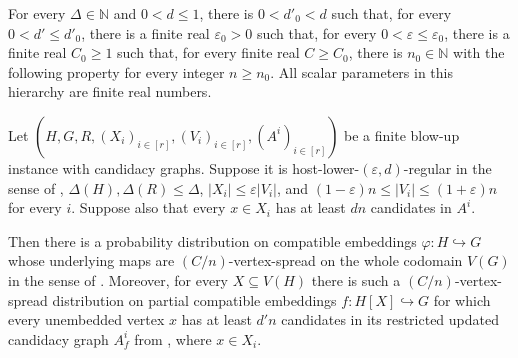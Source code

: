 \begin{lemma}
For every $\Delta\in\mathbb N$ and $0<d\leq1$, there is $0<d'_0<d$ such that, for every $0<d'\leq d'_0$, there is a finite real $\varepsilon_0>0$ such that, for every $0<\varepsilon\leq\varepsilon_0$, there is a finite real $C_0\geq1$ such that, for every finite real $C\geq C_0$, there is $n_0\in\mathbb N$ with the following property for every integer $n\geq n_0$. All scalar parameters in this hierarchy are finite real numbers.

Let $(H,G,R,(X_i)_{i\in[r]},(V_i)_{i\in[r]},(A^i)_{i \in [r]})$ be a finite blow-up instance with candidacy graphs.  Suppose it is host-lower-$(\varepsilon,d)$-regular in the sense of , $\Delta(H),\Delta(R)\leq\Delta$, $|X_i|\leq\varepsilon|V_i|$, and $(1-\varepsilon)n\leq|V_i|\leq(1+\varepsilon)n$ for every $i$.  Suppose also that every $x\in X_i$ has at least $dn$ candidates in $A^i$.

Then there is a probability distribution on compatible embeddings $\varphi:H\hookrightarrow G$ whose underlying maps are $(C/n)$-vertex-spread on the whole codomain $V(G)$ in the sense of .  Moreover, for every $X\subseteq V(H)$ there is such a $(C/n)$-vertex-spread distribution on partial compatible embeddings $f:H[X]\hookrightarrow G$ for which every unembedded vertex $x$ has at least $d'n$ candidates in its restricted updated candidacy graph $A_f^i$ from , where $x\in X_i$.
\end{lemma}
